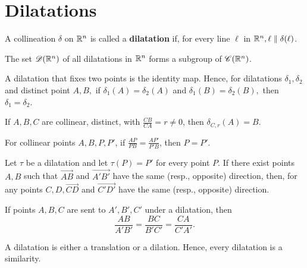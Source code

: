 \section{Dilatations}

\begin{definition}
    A collineation \(\delta\) on \(\mathbb{R}^n\) is called a \textbf{dilatation} if, for every line \(\ell\) in \(\mathbb{R}^n, \ell \parallel \delta(\ell)\).
\end{definition}

\begin{proposition}
    The set \(\mathscr{D}(\mathbb{R}^n)\) of all dilatations in \(\mathbb{R}^n\) forms a subgroup of \(\mathscr{C}(\mathbb{R}^n)\).
\end{proposition}

\begin{lemma}
    A dilatation that fixes two points is the identity map. Hence, for dilatations \(\delta_1, \delta_2\) and distinct point \(A, B, \) if \(\delta_1(A) = \delta_2(A)\) and \(\delta_1(B) = \delta_2(B), \) then \(\delta_1 = \delta_2\).
\end{lemma}

\begin{lemma}
    \begin{statements}{}
        \item If \(A, B, C\) are collinear, distinct, with \(\frac{CB}{CA} = r \neq 0\), then \(\delta_{C, r}(A) = B\).
        \item For collinear points \(A, B, P, P'\), if \(\frac{AP}{PB} = \frac{AP'}{P'B}\), then \(P = P'\).
        \item Let \(\tau\) be a dilatation and let \(\tau(P) = P'\) for every point \(P\). If there exist points \(A, B\) such that \(\overrightarrow{AB}\) and \(\overrightarrow{A'B'}\) have the same (resp., opposite) direction, then, for any points \(C, D, \overrightarrow{CD}\) and \(\overrightarrow{C'D'}\) have the same (resp., opposite) direction.
    \end{statements}
\end{lemma}

\begin{corollary}
    If points \(A, B, C\) are sent to \(A', B', C'\) under a dilatation, then
    \[\frac{AB}{A'B'} = \frac{BC}{B'C'} = \frac{CA}{C'A'}.\]
\end{corollary}

\begin{theorem}
    A dilatation is either a translation or a dilation. Hence, every dilatation is a similarity.
\end{theorem}